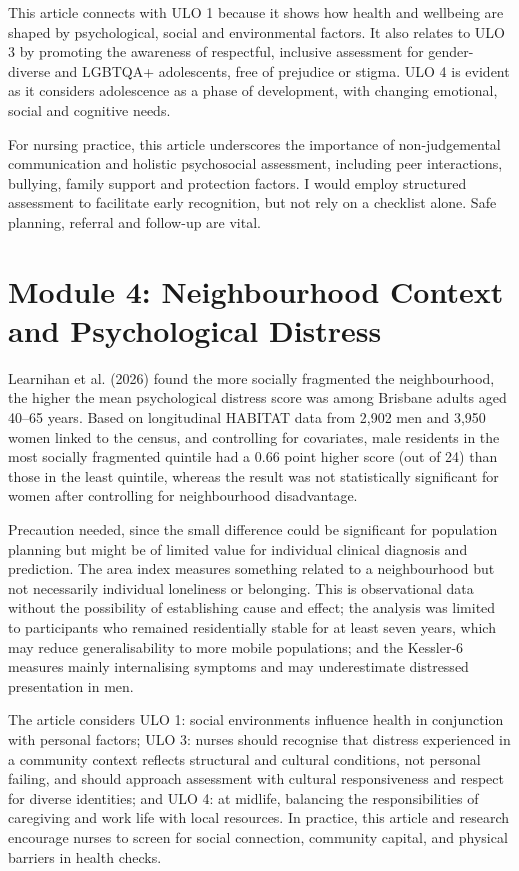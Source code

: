 \documentclass[12pt,a4paper]{article}
\begin{document}
This article connects with ULO 1 because it shows how health and wellbeing are shaped by psychological, social and environmental factors. It also relates to ULO 3 by promoting the awareness of respectful, inclusive assessment for gender-diverse and LGBTQA+ adolescents, free of prejudice or stigma. ULO 4 is evident as it considers adolescence as a phase of development, with changing emotional, social and cognitive needs. 

For nursing practice, this article underscores the importance of non-judgemental communication and holistic psychosocial assessment, including peer interactions, bullying, family support and protection factors.  I would employ structured assessment to facilitate early recognition, but not rely on a checklist alone. Safe planning, referral and follow-up are vital.

\section*{Module 4: Neighbourhood Context and Psychological Distress}

Learnihan et al. (2026) found the more socially fragmented the neighbourhood, the higher the mean psychological distress score was among Brisbane adults aged 40--65 years. Based on longitudinal HABITAT data from 2,902 men and 3,950 women linked to the census, and controlling for covariates, male residents in the most socially fragmented quintile had a 0.66 point higher score (out of 24) than those in the least quintile, whereas the result was not statistically significant for women after controlling for neighbourhood disadvantage.

Precaution needed, since the small difference could be significant for population planning but might be of limited value for individual clinical diagnosis and prediction. The area index measures something related to a neighbourhood but not necessarily individual loneliness or belonging. This is observational data without the possibility of establishing cause and effect; the analysis was limited to participants who remained residentially stable for at least seven years, which may reduce generalisability to more mobile populations; and the Kessler-6 measures mainly internalising symptoms and may underestimate distressed presentation in men.

The article considers ULO 1: social environments influence health in conjunction with personal factors; ULO 3: nurses should recognise that distress experienced in a community context reflects structural and cultural conditions, not personal failing, and should approach assessment with cultural responsiveness and respect for diverse identities; and ULO 4: at midlife, balancing the responsibilities of caregiving and work life with local resources. In practice, this article and research encourage nurses to screen for social connection, community capital, and physical barriers in health checks.
\end{document}
